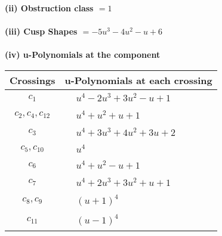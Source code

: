\documentclass[1p]{elsarticle_modified}
\theoremstyle{definition}
\begin{document}
\flushleft \textbf{(ii) Obstruction class $= 1$}\\~\\
\flushleft \textbf{(iii) Cusp Shapes $= -5 u^3-4 u^2- u+6$}\\~\\
\newpage\renewcommand{\arraystretch}{1}
\flushleft \textbf{(iv) u-Polynomials at the component}\newline \\
\begin{tabular}{m{50pt}|m{274pt}}
Crossings & \hspace{64pt}u-Polynomials at each crossing \\
\hline $$\begin{aligned}c_{1}\end{aligned}$$&$\begin{aligned}
&u^4-2 u^3+3 u^2- u+1
\end{aligned}$\\
\hline $$\begin{aligned}c_{2},c_{4},c_{12}\end{aligned}$$&$\begin{aligned}
&u^4+u^2+u+1
\end{aligned}$\\
\hline $$\begin{aligned}c_{3}\end{aligned}$$&$\begin{aligned}
&u^4+3 u^3+4 u^2+3 u+2
\end{aligned}$\\
\hline $$\begin{aligned}c_{5},c_{10}\end{aligned}$$&$\begin{aligned}
&u^4
\end{aligned}$\\
\hline $$\begin{aligned}c_{6}\end{aligned}$$&$\begin{aligned}
&u^4+u^2- u+1
\end{aligned}$\\
\hline $$\begin{aligned}c_{7}\end{aligned}$$&$\begin{aligned}
&u^4+2 u^3+3 u^2+u+1
\end{aligned}$\\
\hline $$\begin{aligned}c_{8},c_{9}\end{aligned}$$&$\begin{aligned}
&(u+1)^4
\end{aligned}$\\
\hline $$\begin{aligned}c_{11}\end{aligned}$$&$\begin{aligned}
&(u-1)^4
\end{aligned}$\\
\hline
\end{tabular}\\~\\
\end{document}

